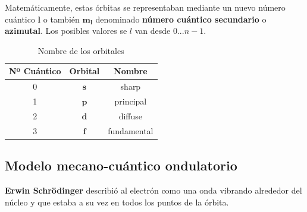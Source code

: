 Matemáticamente, estas órbitas se representaban mediante un nuevo número cuántico  \(\bm{l}\) o también \(\bm{m_l}\) denominado \textbf{número cuántico secundario} o \textbf{azimutal}.
Los posibles valores se \(l\) van desde \(0 ... n-1\).
\begin{table}[H]
    \centering
    \caption{Nombre de los orbitales}
    \vspace{-5pt}
    \begin{tabular}{@{}ccc@{}}
        \toprule
        \textbf{Nº Cuántico} & \textbf{Orbital} & \textbf{Nombre} \\
        \bottomrule
        0                    & \(\bm{s}\)       & sharp \\[3pt]
        1                    & \(\bm{p}\)       & principal              \\[3pt]
        2                    & \(\bm{d}\)       & diffuse \\[3pt]
        3                    & \(\bm{f}\)       & fundamental     \\
        \bottomrule
    \end{tabular}
    \label{tab:nombre_orbitales}
\end{table}

\subsection{Modelo mecano-cuántico ondulatorio}

\textbf{Erwin Schrödinger} describió al electrón como una onda vibrando alrededor del núcleo y que estaba a su vez en todos los puntos de la órbita.

